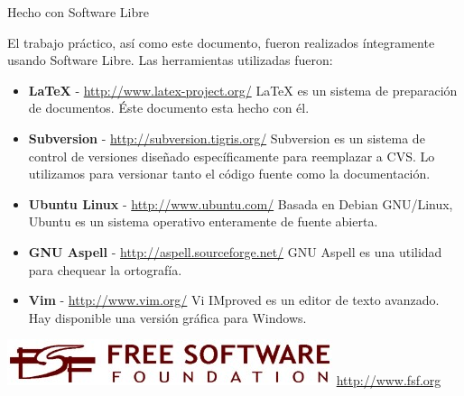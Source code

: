 %
% 
%


\begin{center}
\LARGE{Hecho con Software Libre}
\end{center}

\noindent

El trabajo práctico, así como este documento, fueron realizados íntegramente
usando Software Libre. Las herramientas utilizadas fueron:

\begin{flushleft}
\begin{itemize}

\item \textbf{\LaTeX} - \href{http://www.latex-project.org/}
  {http://www.latex-project.org/}
\linebreak\LaTeX{} es un sistema de preparación de documentos. Éste
  documento esta hecho con él.

\item \textbf{Subversion} - \href{http://subversion.tigris.org/}
  {http://subversion.tigris.org/}
\linebreak Subversion es un sistema de control de versiones diseñado
  específicamente para reemplazar a CVS. Lo utilizamos para versionar
  tanto el código fuente como la documentación.

\item \textbf{Ubuntu Linux} - \href{http://www.ubuntu.com/}
  {http://www.ubuntu.com/}
\linebreak Basada en Debian GNU/Linux, Ubuntu es un sistema operativo
enteramente de fuente abierta.

\item \textbf{GNU Aspell} - \href{http://aspell.sourceforge.net//}
  {http://aspell.sourceforge.net/}
\linebreak GNU Aspell es una utilidad para chequear la ortografía.

\item \textbf{Vim} - \href{http://www.vim.org/}
  {http://www.vim.org/}
\linebreak Vi IMproved es un editor de texto avanzado. Hay disponible una
versión gráfica para Windows.

\end{itemize}
\end{flushleft}

\begin{center}
\includegraphics[scale=0.50]{hechoconsl/logofsf.jpg}
\linebreak\href{http://www.fsf.org}{http://www.fsf.org}
\end{center}

